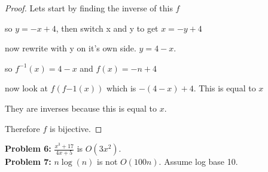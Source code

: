 \documentclass[12pt]{article}
\begin{document}
\begin{proof}

    Lets start by finding the inverse of this $f$

    so $y=-x+4$, then switch x and y to get $x=-y+4$

    now rewrite with y on it's own side. $y=4-x$.

    so $f^{-1}(x)=4-x$ and $f(x)=-n+4$

    now look at $f(f{-1}(x))$ which is $-(4-x)+4$. This is equal to $x$

    They are inverses because this is equal to $x$.

    Therefore $f$ is bijective.

\end{proof}

{\bf Problem 6:} $\frac{x^3+17}{4x+5}$ is $O(3x^2)$. \\

{\bf Problem 7:} $n \log(n)$ is not $O(100 n)$. Assume log base 10.\\
\end{document}
